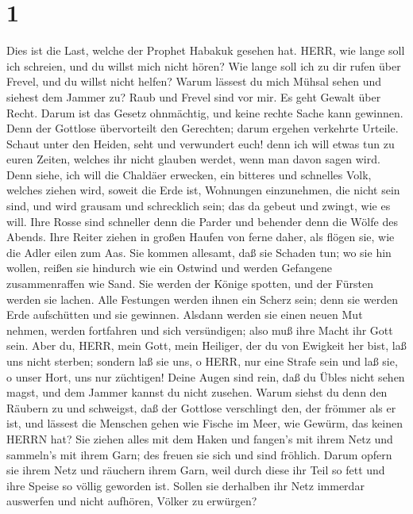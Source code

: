 \hypertarget{section}{%
\section{1}\label{section}}

 Dies ist die Last, welche der Prophet Habakuk gesehen hat.
 HERR, wie lange soll ich schreien, und du willst mich nicht
hören? Wie lange soll ich zu dir rufen über Frevel, und du willst nicht
helfen?  Warum lässest du mich Mühsal sehen und siehest dem
Jammer zu? Raub und Frevel sind vor mir. Es geht Gewalt über Recht.
 Darum ist das Gesetz ohnmächtig, und keine rechte Sache
kann gewinnen. Denn der Gottlose übervorteilt den Gerechten; darum
ergehen verkehrte Urteile.  Schaut unter den Heiden, seht
und verwundert euch! denn ich will etwas tun zu euren Zeiten, welches
ihr nicht glauben werdet, wenn man davon sagen wird.  Denn
siehe, ich will die Chaldäer erwecken, ein bitteres und schnelles Volk,
welches ziehen wird, soweit die Erde ist, Wohnungen einzunehmen, die
nicht sein sind,  und wird grausam und schrecklich sein; das
da gebeut und zwingt, wie es will.  Ihre Rosse sind
schneller denn die Parder und behender denn die Wölfe des Abends. Ihre
Reiter ziehen in großen Haufen von ferne daher, als flögen sie, wie die
Adler eilen zum Aas.  Sie kommen allesamt, daß sie Schaden
tun; wo sie hin wollen, reißen sie hindurch wie ein Ostwind und werden
Gefangene zusammenraffen wie Sand.  Sie werden der Könige
spotten, und der Fürsten werden sie lachen. Alle Festungen werden ihnen
ein Scherz sein; denn sie werden Erde aufschütten und sie gewinnen.
 Alsdann werden sie einen neuen Mut nehmen, werden
fortfahren und sich versündigen; also muß ihre Macht ihr Gott sein.
 Aber du, HERR, mein Gott, mein Heiliger, der du von
Ewigkeit her bist, laß uns nicht sterben; sondern laß sie uns, o HERR,
nur eine Strafe sein und laß sie, o unser Hort, uns nur züchtigen!
 Deine Augen sind rein, daß du Übles nicht sehen magst, und
dem Jammer kannst du nicht zusehen. Warum siehst du denn den Räubern zu
und schweigst, daß der Gottlose verschlingt den, der frömmer als er ist,
 und lässest die Menschen gehen wie Fische im Meer, wie
Gewürm, das keinen HERRN hat?  Sie ziehen alles mit dem
Haken und fangen's mit ihrem Netz und sammeln's mit ihrem Garn; des
freuen sie sich und sind fröhlich.  Darum opfern sie ihrem
Netz und räuchern ihrem Garn, weil durch diese ihr Teil so fett und ihre
Speise so völlig geworden ist.  Sollen sie derhalben ihr
Netz immerdar auswerfen und nicht aufhören, Völker zu erwürgen?

